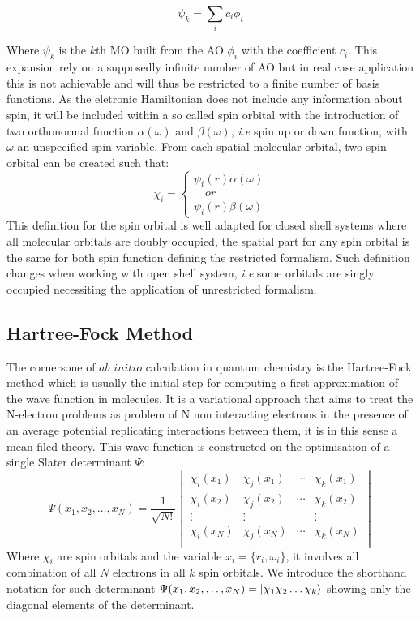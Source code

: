 \documentclass[10pt]{report}
\numberwithin{equation}{section}
\begin{document}
\begin{equation}
    \psi_k=\sum_{i}c_i \phi_i
\end{equation}

Where $\psi_k$ is the $k$th MO built from the AO $\phi_i$ with the coefficient $c_i$. 
This expansion rely on a supposedly infinite number of AO but in real case application this is not achievable and will thus be restricted to a finite number of basis functions.
As the eletronic Hamiltonian does not include any information about spin, it will be included within a so called spin orbital with the introduction of two orthonormal function $\alpha(\omega)$ and $\beta(\omega)$, \textit{i.e} spin up or down function, with $\omega$ an unspecified spin variable.
From each spatial molecular orbital, two spin orbital can be created such that:
\begin{equation}
    \chi_i=\begin{cases}
    \psi_i(r)\alpha(\omega)\\
    \quad or \\
    \psi_i(r)\beta(\omega)
    \end{cases}
\end{equation}
This definition for the spin orbital is well adapted for closed shell systems where all molecular orbitals are doubly occupied, the spatial part for any spin orbital is the same for both spin function defining the restricted formalism.
Such definition changes when working with open shell system, \textit{i.e} some orbitals are singly occupied  necessiting the application of unrestricted formalism.

\subsection{Hartree-Fock Method}
The cornersone of $ab$ $initio$ calculation in quantum chemistry is the Hartree-Fock method which is usually the initial step for computing a first approximation of the wave function in molecules. 
It is a variational approach that aims to treat the N-electron problems as problem of N non interacting electrons in the presence of an average potential replicating interactions between them, it is in this sense a mean-filed theory.
This wave-function is constructed on the optimisation of a single Slater determinant $\Psi$:
\begin{equation}
    \Psi(x_1,x_2,\ldots,x_N)=\frac{1}{\sqrt{N!}}
    \begin{vmatrix}
        \chi_i (x_1) & \chi_j (x_1) & \cdots & \chi_k (x_1)\\
        \chi_i (x_2) & \chi_j (x_2) & \cdots & \chi_k (x_2)\\
        \vdots & \vdots &   &  \vdots\\
        \chi_i (x_N) & \chi_j (x_N) & \cdots & \chi_k (x_N)\\
    \end{vmatrix}
\end{equation}
Where $\chi_i$ are spin orbitals and the variable $x_i=\{r_i,\omega_i\}$, it involves all combination of all $N$ electrons in all $k$ spin orbitals. 
We introduce the shorthand notation for such determinant $\Psi(x_1,x_2,\ldots,x_N)=\ket{\chi_1\chi_2\ldots\chi_k}$ showing only the diagonal elements of the determinant.
\end{document}
